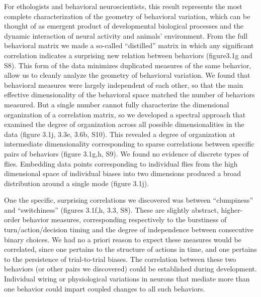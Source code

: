 \documentclass[12pt,letterpaper]{article}
\begin{document}
For ethologists and behavioral neuroscientists, this result represents the most complete characterization of the geometry of behavioral variation, which can be thought of as emergent product of developmental biological processes and the dynamic interaction of neural activity and animals’ environment. From the full behavioral matrix we made a so-called “distilled” matrix in which any significant correlation indicates a surprising new relation between behaviors (figure3.1g and S8). This form of the data minimizes duplicated measures of the same behavior, allow us to cleanly analyze the geometry of behavioral variation. We found that behavioral measures were largely independent of each other, so that the main effective dimensionality of the behavioral space matched the number of behaviors measured. But a single number cannot fully characterize the dimensional organization of a correlation matrix, so we developed a spectral approach that examined the degree of organization across all possible dimensionalities in the data (figure 3.1j, 3.3e, 3.6b, S10). This revealed a degree of organization at intermediate dimensionality corresponding to sparse correlations between specific pairs of behaviors (figure 3.1g,h, S9). We found no evidence of discrete types of flies. Embedding data points corresponding to individual flies from the high dimensional space of individual biases into two dimensions produced a broad distribution around a single mode (figure 3.1j).

One the specific, surprising correlations we discovered was between “clumpiness” and “switchiness” (figures 3.1f,h, 3.3, S8). These are slightly abstract, higher-order behavior measures, corresponding respectively to the burstiness of turn/action/decision timing and the degree of independence between consecutive binary choices. We had no a priori reason to expect these measures would be correlated, since one pertains to the structure of actions in time, and one pertains to the persistence of trial-to-trial biases. The correlation between these two behaviors (or other pairs we discovered) could be established during development. Individual wiring \cite{Linneweber_A_2019,Mellert_Genetic_2016} or physiological variations in neurons that mediate more than one behavior could impart coupled changes to all such behaviors. 
\end{document}
